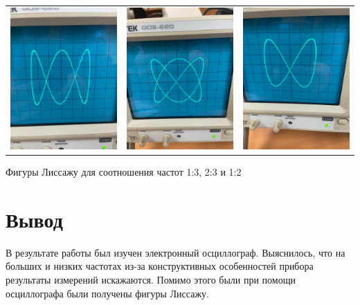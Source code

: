 \documentclass[a4paper,12pt]{article}
\begin{document}
		\begin{center}

	
		\begin{tabular}{c c c}
			
			\includegraphics[width=0.3\linewidth]{l1.jpg} & 	\includegraphics[width=0.3\linewidth]{l2.jpg}& 	\includegraphics[width=0.3\linewidth]{l3.jpg}\\
			
	
			
\end{tabular} 

Фигуры Лиссажу для соотношения частот 1:3, 2:3 и 1:2 \\ 

	\end{center}


	

	\newpage
	
	
	\section*{Вывод}
В результате работы был изучен электронный осциллограф. Выяснилось, что на больших и низких частотах из-за конструктивных особенностей прибора результаты измерений искажаются. Помимо этого были при помощи осциллографа были получены фигуры Лиссажу.






\newpage
\end{document}
